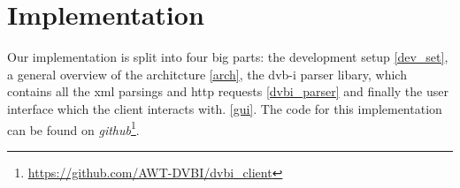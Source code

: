 \documentclass[conference]{IEEEtran}
\begin{document}

\section{Implementation}



Our implementation is split into four big parts: the development setup \ref{dev_set}, a general overview of the architcture  \ref{arch}, the dvb-i parser libary, which contains all the xml parsings and http requests \ref{dvbi_parser} and finally the user interface which the client interacts with. \ref{gui}. The code for this implementation can be found on \emph{github}\footnote{\url{https://github.com/AWT-DVBI/dvbi_client}}.
\end{document}
